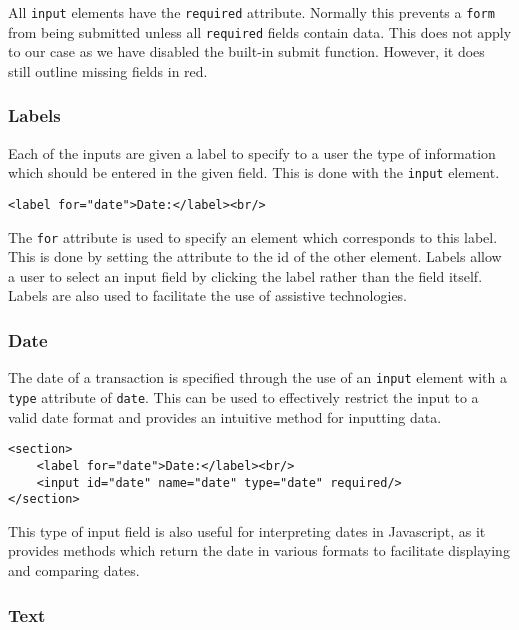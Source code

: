 \documentclass[letterpaper]{article}
\begin{document}
All \lstinline{input} elements have the \lstinline{required} attribute.
Normally this prevents a \lstinline{form} from being submitted unless all \lstinline{required} fields contain data.
This does not apply to our case as we have disabled the built-in submit function.
However, it does still outline missing fields in red.

\subsubsection{Labels}

Each of the inputs are given a label to specify to a user the type of information which should be entered in the given field.
This is done with the \lstinline{input} element.

\begin{lstlisting}[firstnumber=12]
<label for="date">Date:</label><br/>
\end{lstlisting}

The \lstinline{for} attribute is used to specify an element which corresponds to this label.
This is done by setting the attribute to the id of the other element.
Labels allow a user to select an input field by clicking the label rather than the field itself.
Labels are also used to facilitate the use of assistive technologies.

\subsubsection{Date}

The date of a transaction is specified through the use of an \lstinline{input} element with a \lstinline{type} attribute of \lstinline{date}.
This can be used to effectively restrict the input to a valid date format and provides an intuitive method for inputting data.

\begin{lstlisting}[firstnumber=11]
<section>
    <label for="date">Date:</label><br/>
    <input id="date" name="date" type="date" required/>
</section>
\end{lstlisting}

This type of input field is also useful for interpreting dates in Javascript, as it provides methods which return the date in various formats to facilitate displaying and comparing dates.

\subsubsection{Text}
\end{document}
